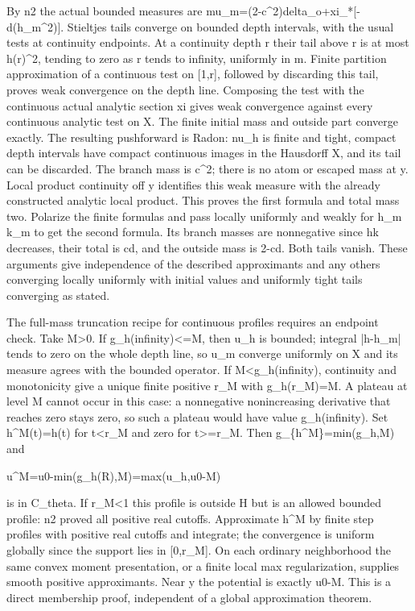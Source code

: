 \documentclass[11pt]{article}
\begin{document}
By n2 the actual bounded measures are mu\_m=(2-c\textasciicircum{}2)delta\_o+xi\_*[-d(h\_m\textasciicircum{}2)]. Stieltjes tails converge on bounded depth intervals, with the usual tests at continuity endpoints. At a continuity depth r their tail above r is at most h(r)\textasciicircum{}2, tending to zero as r tends to infinity, uniformly in m. Finite partition approximation of a continuous test on [1,r], followed by discarding this tail, proves weak convergence on the depth line. Composing the test with the continuous actual analytic section xi gives weak convergence against every continuous analytic test on X. The finite initial mass and outside part converge exactly. The resulting pushforward is Radon: nu\_h is finite and tight, compact depth intervals have compact continuous images in the Hausdorff X, and its tail can be discarded. The branch mass is c\textasciicircum{}2; there is no atom or escaped mass at y. Local product continuity off y identifies this weak measure with the already constructed analytic local product. This proves the first formula and total mass two. Polarize the finite formulas and pass locally uniformly and weakly for h\_m k\_m to get the second formula. Its branch masses are nonnegative since hk decreases, their total is cd, and the outside mass is 2-cd. Both tails vanish. These arguments give independence of the described approximants and any others converging locally uniformly with initial values and uniformly tight tails converging as stated.

The full-mass truncation recipe for continuous profiles requires an endpoint check. Take M>0. If g\_h(infinity)<=M, then u\_h is bounded; integral |h-h\_m| tends to zero on the whole depth line, so u\_m converge uniformly on X and its measure agrees with the bounded operator. If M<g\_h(infinity), continuity and monotonicity give a unique finite positive r\_M with g\_h(r\_M)=M. A plateau at level M cannot occur in this case: a nonnegative nonincreasing derivative that reaches zero stays zero, so such a plateau would have value g\_h(infinity). Set h\textasciicircum{}M(t)=h(t) for t<r\_M and zero for t>=r\_M. Then g\_\{h\textasciicircum{}M\}=min(g\_h,M) and

u\textasciicircum{}M=u0-min(g\_h(R),M)=max(u\_h,u0-M)

is in C\_theta. If r\_M<1 this profile is outside H but is an allowed bounded profile: n2 proved all positive real cutoffs. Approximate h\textasciicircum{}M by finite step profiles with positive real cutoffs and integrate; the convergence is uniform globally since the support lies in [0,r\_M]. On each ordinary neighborhood the same convex moment presentation, or a finite local max regularization, supplies smooth positive approximants. Near y the potential is exactly u0-M. This is a direct membership proof, independent of a global approximation theorem.
\end{document}

